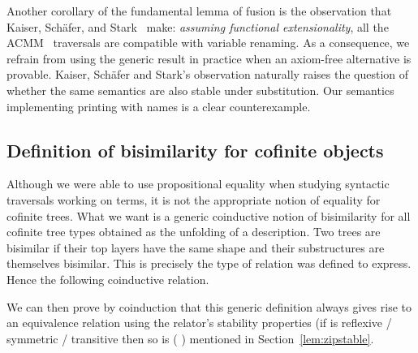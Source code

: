 {\begin{agdasnippet}
\end{agdasnippet}

Another corollary of the fundamental lemma of fusion is the observation that
Kaiser, Schäfer, and Stark~\citeyear{Kaiser-wsdebr} make: \emph{assuming
functional extensionality}, all the ACMM~\citeyear{allais2017type} traversals
are compatible with variable renaming.
As a consequence, we refrain from using the generic result in practice when
an axiom-free alternative is provable. Kaiser, Schäfer and Stark's observation
naturally raises the question of whether the same semantics are also stable
under substitution. Our semantics implementing printing with names is a clear
counterexample.



\subsection{Definition of bisimilarity for cofinite objects}

Although we were able to use propositional equality when studying
syntactic traversals working on terms, it is not the appropriate
notion of equality for cofinite trees. What we want is a generic
coinductive notion of bisimilarity for all cofinite tree types
obtained as the unfolding of a description. Two trees are bisimilar
if their top layers have the same shape and their substructures are
themselves bisimilar. This is precisely the type of relation 
was defined to express. Hence the following coinductive relation.

\begin{agdasnippet}
\end{agdasnippet}

We can then prove by coinduction that this generic definition always gives
rise to an equivalence relation using the relator's stability properties
(if  is reflexive / symmetric / transitive then so is {(   )}
mentioned in Section~\ref{lem:zipstable}.

}
